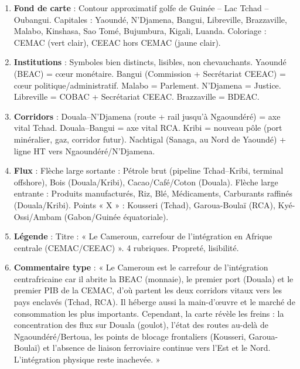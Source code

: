\documentclass[11pt]{article}
\begin{document}
\begin{corrige}
\begin{enumerate}
\item \textbf{Fond de carte} : Contour approximatif golfe de Guinée -- Lac Tchad -- Oubangui. Capitales : Yaoundé, N'Djamena, Bangui, Libreville, Brazzaville, Malabo, Kinshasa, Sao Tomé, Bujumbura, Kigali, Luanda. Coloriage : CEMAC (vert clair), CEEAC hors CEMAC (jaune clair).
\item \textbf{Institutions} : Symboles bien distincts, lisibles, non chevauchants. Yaoundé (BEAC) = cœur monétaire. Bangui (Commission + Secrétariat CEEAC) = cœur politique/administratif. Malabo = Parlement. N'Djamena = Justice. Libreville = COBAC + Secrétariat CEEAC. Brazzaville = BDEAC.
\item \textbf{Corridors} : Douala--N'Djamena (route + rail jusqu'à Ngaoundéré) = axe vital Tchad. Douala--Bangui = axe vital RCA. Kribi = nouveau pôle (port minéralier, gaz, corridor futur). Nachtigal (Sanaga, au Nord de Yaoundé) + ligne HT vers Ngaoundéré/N'Djamena.
\item \textbf{Flux} : Flèche large sortante : Pétrole brut (pipeline Tchad--Kribi, terminal offshore), Bois (Douala/Kribi), Cacao/Café/Coton (Douala). Flèche large entrante : Produits manufacturés, Riz, Blé, Médicaments, Carburants raffinés (Douala/Kribi). Points « X » : Kousseri (Tchad), Garoua-Boulaï (RCA), Kyé-Ossi/Ambam (Gabon/Guinée équatoriale).
\item \textbf{Légende} : Titre : « Le Cameroun, carrefour de l'intégration en Afrique centrale (CEMAC/CEEAC) ». 4 rubriques. Propreté, lisibilité.
\item \textbf{Commentaire type} : « Le Cameroun est le carrefour de l'intégration centrafricaine car il abrite la BEAC (monnaie), le premier port (Douala) et le premier PIB de la CEMAC, d'où partent les deux corridors vitaux vers les pays enclavés (Tchad, RCA). Il héberge aussi la main-d'œuvre et le marché de consommation les plus importants. Cependant, la carte révèle les freins : la concentration des flux sur Douala (goulot), l'état des routes au-delà de Ngaoundéré/Bertoua, les points de blocage frontaliers (Kousseri, Garoua-Boulaï) et l'absence de liaison ferroviaire continue vers l'Est et le Nord. L'intégration physique reste inachevée. »
\end{enumerate}
\end{corrige}
\end{document}
